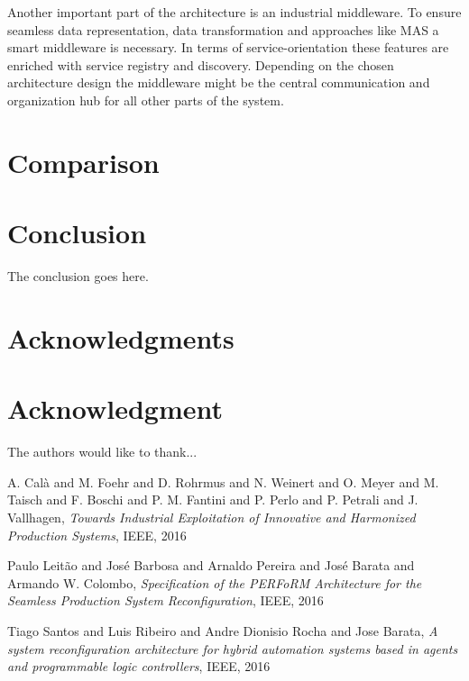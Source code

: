 \documentclass[conference,compsoc,hidelinks]{IEEEtran}
\begin{document}
Another important part of the architecture is an industrial middleware. To ensure seamless data representation, data transformation and approaches like MAS a smart middleware is necessary. In terms of service-orientation these features are enriched with service registry and discovery. Depending on the chosen architecture design the middleware might be the central communication and organization hub for all other parts of the system.

\section{Comparison} \label{comparison} %
\section{Conclusion} %
The conclusion goes here.

\ifCLASSOPTIONcompsoc
  \section*{Acknowledgments}
\else
  \section*{Acknowledgment}
\fi

The authors would like to thank...

\begin{thebibliography}{1}

A. Calà and M. Foehr and D. Rohrmus and N. Weinert and O. Meyer and M. Taisch and F. Boschi and P. M. Fantini and P. Perlo and P. Petrali and J. Vallhagen, \emph{Towards Industrial Exploitation of Innovative and Harmonized Production Systems}, IEEE, 2016

Paulo Leitão and José Barbosa and Arnaldo Pereira and José Barata  and Armando W. Colombo, \emph{Specification of the PERFoRM Architecture for the Seamless Production System Reconfiguration}, IEEE, 2016

Tiago Santos and Luis Ribeiro and Andre Dionisio Rocha and Jose Barata, \emph{A system reconfiguration architecture for hybrid
automation systems based in agents and
programmable logic controllers}, IEEE, 2016

\end{thebibliography}

\end{document}
